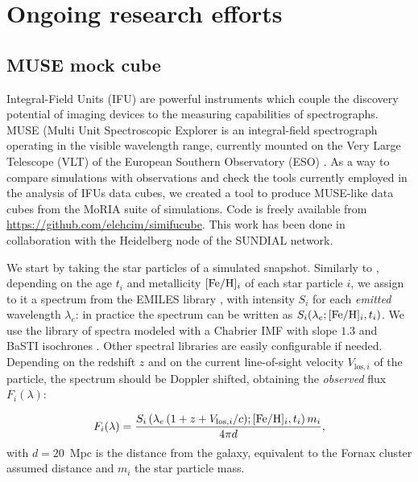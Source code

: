\section{Ongoing research efforts}
\subsection{MUSE mock cube}
Integral-Field Units (IFU) are powerful instruments which couple the discovery potential of imaging devices to the measuring capabilities of spectrographs.
MUSE (Multi Unit Spectroscopic Explorer is an integral-field spectrograph operating in the visible wavelength range, currently mounted on the Very Large Telescope (VLT) of the European Southern Observatory (ESO) \citep{Bacon2010, MUSEWebpage}.
As a way to compare simulations with observations and check the tools currently employed in the analysis of IFUs data cubes, we created a tool to produce MUSE-like data cubes from the MoRIA suite of simulations.
Code is freely available from \url{https://github.com/elehcim/simifucube}.
This work has been done in collaboration with the Heidelberg node of the SUNDIAL network.

We start by taking the star particles of a simulated snapshot.
Similarly to \citet{Ibarra-Medel2019}, depending on the age $t_i$ and metallicity $[\text{Fe}/\text{H}]_i$ of each star particle $i$, we assign to it a spectrum from the EMILES library \citep{Vazdekis2010}, with intensity $S_i$ for each \emph{emitted} wavelength $\lambda_e$: in practice the spectrum can be written as $S_i(\lambda_e;[\text{Fe}/\text{H}]_i, t_i)$.
We use the library of spectra modeled with a Chabrier IMF with slope $1.3$ and BaSTI isochrones \citep[][Bag of Stellar Tracks and Isochrones]{Pietrinferni2013}.
Other spectral libraries are easily configurable if needed.
Depending on the redshift $z$ and on the current line-of-sight velocity $V_{\mathrm{los},i}$ of the particle, the spectrum should be Doppler shifted, obtaining the \emph{observed} flux $F_i(\lambda)$:

\begin{equation}
  F_i(\lambda) = \frac{S_i\left(\lambda_e\,(1 + z + V_{\mathrm{los},i}/c);[\text{Fe}/\text{H}]_i, t_i \right) m_i }{4\pi d},
  \label{eq:shifted_flux}
\end{equation}
with $d = 20$~Mpc is the distance from the galaxy, equivalent to the Fornax cluster assumed distance and $m_i$ the star particle mass.

